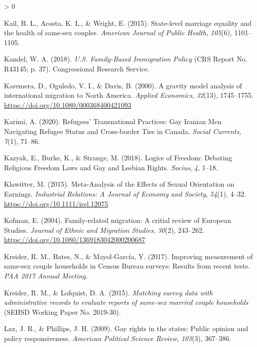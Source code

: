 \documentclass[
  12pt,
]{article}
\newlength{\cslhangindent}
\newenvironment{CSLReferences}[2] %
 {%
  \setlength{\parindent}{0pt}
  \ifodd #1 \everypar{\setlength{\hangindent}{\cslhangindent}}\ignorespaces\fi
  \ifnum #2 > 0
  \setlength{\parskip}{#2\baselineskip}
  \fi
 }%
 {}
\begin{document}
\begin{CSLReferences}{1}{0}
\leavevmode\hypertarget{ref-kail_2015}{}%
Kail, B. L., Acosta, K. L., \& Wright, E. (2015). State-level marriage equality and the health of same-sex couples. \emph{American Journal of Public Health}, \emph{105}(6), 1101--1105.

\leavevmode\hypertarget{ref-kandel_2018_familybased}{}%
Kandel, W. A. (2018). \emph{U.{S}. {Family}-{Based Immigration Policy}} (CRS Report No. R43145; p. 37). {Congressional Research Service}.

\leavevmode\hypertarget{ref-karemera_2000}{}%
Karemera, D., Oguledo, V. I., \& Davis, B. (2000). A gravity model analysis of international migration to {North America}. \emph{Applied Economics}, \emph{32}(13), 1745--1755. \url{https://doi.org/10.1080/000368400421093}

\leavevmode\hypertarget{ref-karimi_2020}{}%
Karimi, A. (2020). Refugees' {Transnational Practices}: Gay {Iranian Men Navigating Refugee Status} and {Cross}-border {Ties} in {Canada}. \emph{Social Currents}, \emph{7}(1), 71--86.

\leavevmode\hypertarget{ref-kazyak_2018}{}%
Kazyak, E., Burke, K., \& Strange, M. (2018). Logics of {Freedom}: Debating {Religious Freedom Laws} and {Gay} and {Lesbian Rights}. \emph{Socius}, \emph{4}, 1--18.

\leavevmode\hypertarget{ref-klawitter_2015}{}%
Klawitter, M. (2015). Meta-{Analysis} of the {Effects} of {Sexual Orientation} on {Earnings}. \emph{Industrial Relations: A Journal of Economy and Society}, \emph{54}(1), 4--32. \url{https://doi.org/10.1111/irel.12075}

\leavevmode\hypertarget{ref-kofman_2004_family}{}%
Kofman, E. (2004). Family-related migration: A critial review of {European Studies}. \emph{Journal of Ethnic and Migration Studies}, \emph{30}(2), 243--262. \url{https://doi.org/10.1080/1369183042000200687}

\leavevmode\hypertarget{ref-kreider_2017}{}%
Kreider, R. M., Bates, N., \& Mayol-García, Y. (2017). Improving measurement of same-sex couple households in {Census Bureau} surveys: Results from recent tests. \emph{{PAA} 2017 Annual Meeting}.

\leavevmode\hypertarget{ref-kreider_2015}{}%
Kreider, R. M., \& Lofquist, D. A. (2015). \emph{Matching survey data with administrative records to evaluate reports of same-sex married couple households} (SEHSD Working Paper No. 2019-30).

\leavevmode\hypertarget{ref-lax_2009}{}%
Lax, J. R., \& Phillips, J. H. (2009). Gay rights in the states: Public opinion and policy responsiveness. \emph{American Political Science Review}, \emph{103}(3), 367--386.


\end{CSLReferences}
\end{document}
